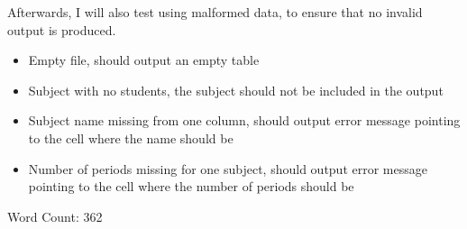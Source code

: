 \documentclass[12pt]{article}
\begin{document}
Afterwards, I will also test using malformed data, to ensure that no invalid output is
produced. 
%
\begin{itemize}
    \item Empty file, should output an empty table
    \item Subject with no students, the subject should not be included in the output
    \item Subject name missing from one column, should output error message pointing to the
        cell where the name should be
    \item Number of periods missing for one subject, should output error message pointing to
        the cell where the number of periods should be
\end{itemize}
%

Word Count: 362
\end{document}
